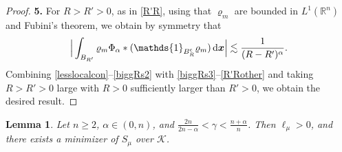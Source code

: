 \documentclass[reqno,11pt]{amsart}
\numberwithin{equation}{section}
\newtheorem{lemma}[theorem]{Lemma}
\theoremstyle{definition}
\def\dd{{\, \rm d}}
\begin{document}
\begin{proof}
  \bigskip     
 \noindent
 {\bf 5.}
For $R > R' > 0$, as in \eqref{R'R}, 
using that $\varrho_m$ are bounded in $L^1(\mathbb{R}^n)$ and Fubini's theorem, 
we obtain by symmetry that
\begin{equation}\label{R'Rother}
\Big| \int_{B_{R'}} \varrho_m \Phi_\alpha * (\mathds{1}_{B_R^{\rm c}}\varrho_m) \dd \boldsymbol{x} \Big| \lesssim \frac{1}{(R - R')^\alpha}.
    \end{equation}
Combining \eqref{lesslocalcon}--\eqref{biggRs2} with \eqref{biggRs3}--\eqref{R'Rother} and 
taking $R > R' > 0$ large with $R>0$ sufficiently larger than $R'>0$, we obtain the desired result.
 \end{proof}
    \setcounter{step}{0}
    \setcounter{case}{0}

\begin{lemma}\label{minexist}
Let $n \geq 2$, $\alpha \in (0,n)$, 
and $\frac{2n}{2n - \alpha} < \gamma < \frac{n + \alpha}{n}$. 
Then  $\ell_\mu > 0$, and there exists a minimizer of $S_\mu$ over $\mathcal{K}$.
\end{lemma}
\end{document}
